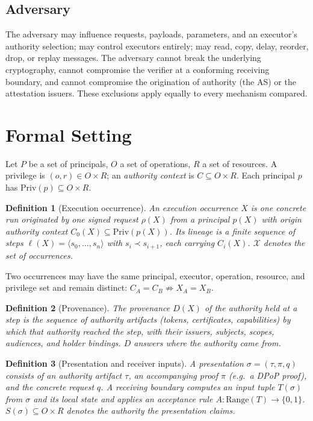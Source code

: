 \documentclass[conference]{IEEEtran}
\newcommand{\Priv}{\mathrm{Priv}}
\newcommand{\X}{\mathcal{X}}
\newtheorem{definition}{Definition}
\begin{document}
\subsection{Adversary}
The adversary may influence requests, payloads, parameters, and an executor's authority selection; may control executors entirely; may read, copy, delay, reorder, drop, or replay messages. The adversary cannot break the underlying cryptography, cannot compromise the verifier at a conforming receiving boundary, and cannot compromise the origination of authority (the AS) or the attestation issuers. These exclusions apply equally to every mechanism compared.

\section{Formal Setting}\label{sec:setting}

Let $P$ be a set of principals, $O$ a set of operations, $R$ a set of resources. A privilege is $(o,r)\in O\times R$; an \emph{authority context} is $C\subseteq O\times R$. Each principal $p$ has $\Priv(p)\subseteq O\times R$.

\begin{definition}[Execution occurrence]\label{def:occurrence}
An \emph{execution occurrence} $X$ is one concrete run originated by one signed request $\rho(X)$ from a principal $p(X)$ with origin authority context $C_0(X)\subseteq\Priv(p(X))$. Its lineage is a finite sequence of steps $\ell(X)=\langle s_0,\dots,s_n\rangle$ with $s_i\prec s_{i+1}$, each carrying $C_i(X)$. $\X$ denotes the set of occurrences.
\end{definition}

Two occurrences may have the same principal, executor, operation, resource, and privilege set and remain distinct: $C_A=C_B \not\Rightarrow X_A=X_B$.

\begin{definition}[Provenance]\label{def:provenance}
The \emph{provenance} $D(X)$ of the authority held at a step is the sequence of authority artifacts (tokens, certificates, capabilities) by which that authority reached the step, with their issuers, subjects, scopes, audiences, and holder bindings. $D$ answers \emph{where the authority came from}.
\end{definition}

\begin{definition}[Presentation and receiver inputs]\label{def:inputs}
A \emph{presentation} $\sigma=(\tau,\pi,q)$ consists of an authority artifact $\tau$, an accompanying proof $\pi$ (e.g.\ a DPoP proof), and the concrete request $q$. A receiving boundary computes an input tuple $T(\sigma)$ from $\sigma$ and its local state and applies an acceptance rule $A:\mathrm{Range}(T)\to\{0,1\}$. $S(\sigma)\subseteq O\times R$ denotes the authority the presentation claims.
\end{definition}
\end{document}
